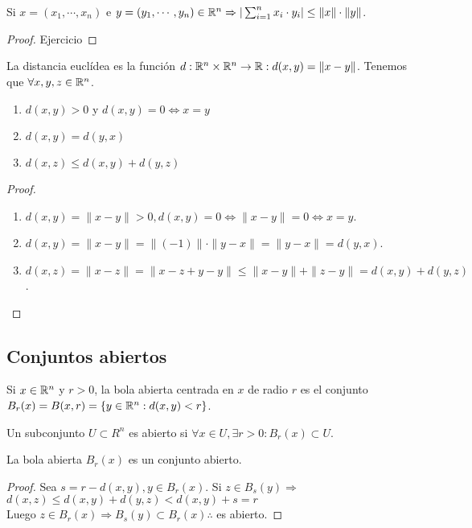 \clearpage

\begin{prop}
  Si $x = (x_1, \cdots, x_n)$ e $y = (y_1, \cdots, y_n) \in \mathbb{R}^n \Rightarrow | \sum_{i = 1}^n x_i \cdot y_i | \leq \|x\| \cdot \|y\|$.
  \begin{proof}
    Ejercicio
  \end{proof}
\end{prop}

\begin{definition}
  La distancia euclídea es la función $d: \mathbb{R}^n \times \mathbb{R}^n \to \mathbb{R} : d(x, y) = \|x-y\|$.
  Tenemos que $\forall x,y,z \in \mathbb{R}^n$.
  \begin{enumerate}
    \item $d(x, y) > 0$ y $d(x, y) = 0 \iff x=y$
    \item $d(x, y) = d(y, x)$
    \item $d(x, z) \leq d(x, y) + d(y, z)$
  \end{enumerate}
  \begin{proof}
    \begin{enumerate}
      \item $d(x, y) = \|x-y\| > 0, d(x, y) = 0 \iff \|x-y\| = 0 \iff x = y$.
      \item $d(x, y) = \|x-y\| = \|(-1)\| \cdot \|y-x\| = \|y-x\| = d(y, x)$.
      \item $d(x, z) = \|x-z\| = \|x-z+y-y\| \leq \|x-y\| + \|z-y\| = d(x, y) + d(y, z)$.
    \end{enumerate}
  \end{proof}
\end{definition}

\subsection{Conjuntos abiertos}
\begin{definition}
  Si $x \in \mathbb{R}^n$ y $r > 0$, la bola abierta centrada en $x$ de radio $r$ es el conjunto $B_r(x) = B(x,r) = \{ y \in \mathbb{R}^n : d(x, y) < r \}$.
\end{definition}

\begin{definition}
  Un subconjunto $U \subset R^n$ es abierto si $\forall x \in U, \exists r > 0 : B_r(x) \subset U$.
\end{definition}

\begin{lemma}
  La bola abierta $B_r(x)$ es un conjunto abierto.
  \begin{proof}
    Sea $s = r - d(x, y), y \in B_r(x)$. Si $z \in B_s(y) \Rightarrow$ \\
    $d(x, z) \leq d(x, y) + d(y, z) < d(x, y) + s = r$ \\
    Luego $z \in B_r(x) \Rightarrow B_s(y) \subset B_r(x) \therefore$ es abierto.
  \end{proof}
\end{lemma}

